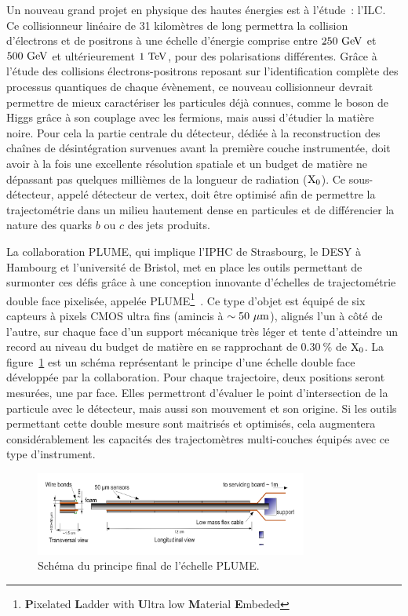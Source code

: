   Un nouveau grand projet en physique des hautes énergies est à l'étude~: l'\acrfull{ILC}. 
  Ce collisionneur linéaire de 31 kilomètres de long permettra la collision d'électrons et de positrons à une échelle d'énergie comprise entre $250~\rm{GeV}$ et $500~\rm{GeV}$ et ultérieurement $1~\rm{TeV}$, pour des polarisations différentes.
  Grâce à l'étude des collisions électrons-positrons reposant sur l'identification complète des processus quantiques de chaque évènement, ce nouveau collisionneur devrait permettre de mieux caractériser les particules déjà connues, comme le boson de Higgs grâce à son couplage avec les fermions, mais aussi d'étudier la matière noire.
  Pour cela la partie centrale du détecteur, dédiée à la reconstruction des chaînes de désintégration survenues avant la première couche instrumentée, doit avoir à la fois une excellente résolution spatiale et un budget de matière ne dépassant pas quelques millièmes de la longueur de radiation ($\rm{X_0}$). 
  Ce sous-détecteur, appelé détecteur de vertex, doit être optimisé afin de permettre la trajectométrie dans un milieu hautement dense en particules et de différencier la nature des quarks $b$ ou $c$ des jets produits.

  La collaboration PLUME, qui implique l'IPHC de Strasbourg, le DESY à Hambourg et l'université de Bristol, met en place les outils permettant de surmonter ces défis grâce à une conception innovante d'échelles de trajectométrie double face pixelisée, appelée PLUME\footnote{\textbf{P}ixelated \textbf{L}adder with \textbf{U}ltra low \textbf{M}aterial \textbf{E}mbeded}~\cite{PLUME}. 
  Ce type d'objet est équipé de six capteurs à pixels CMOS ultra fins (amincis à $\sim 50~\rm{\mu m}$), alignés l'un à côté de l'autre, sur chaque face d'un support mécanique très léger et tente d'atteindre un record au niveau du budget de matière en se rapprochant de $0.30~\%$ de $\rm{X_0}$.
  La figure~\ref{fig:PLUME_resume} est un schéma représentant le principe d'une échelle double face développée par la collaboration.
  Pour chaque trajectoire, deux positions seront mesurées, une par face. 
  Elles permettront d'évaluer le point d'intersection de la particule avec le détecteur, mais aussi son mouvement et son origine. 
  Si les outils permettant cette double mesure sont maitrisés et optimisés, cela augmentera considérablement les capacités des trajectomètres multi-couches équipés avec ce type d'instrument.

  \begin{figure}
    \centering
    \includegraphics[width = 0.8\textwidth]{Pictures/vxd/plume_finalGoal.png}
    \caption{Schéma du principe final de l'échelle PLUME.}
    \label{fig:PLUME_resume}
  \end{figure}

